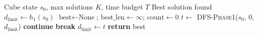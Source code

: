 \documentclass[graybox]{svmult}
\begin{document}
\begin{algorithm}[t]
\caption{Multi-Solution Phase~1 IDA*}
\label{alg:multi-phase1}
\begin{algorithmic}[1]
\REQUIRE Cube state $s_0$, max solutions $K$, time budget $T$
\ENSURE Best solution found
\STATE $d_{\text{limit}} \gets h_1(s_0)$
\STATE $\text{best} \gets \text{None}$; $\text{best\_len} \gets \infty$; $\text{count} \gets 0$
  \STATE $t \gets$ \textsc{DFS-Phase1}($s_0$, $0$, $d_{\text{limit}}$)
    \STATE \textbf{continue}
    \STATE \textbf{break} 
  \ELSE
    \STATE $d_{\text{limit}} \gets t$ 
  \ENDIF
\ENDWHILE
\STATE \textbf{return} best
\end{algorithmic}
\end{algorithm}
\end{document}
